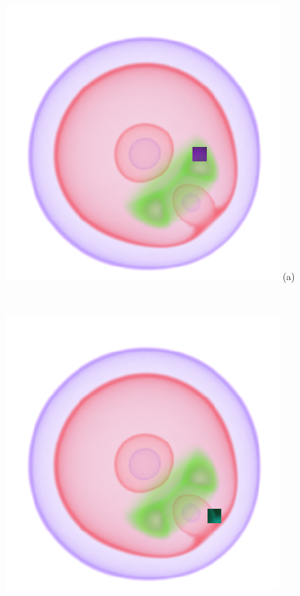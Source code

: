 \documentclass[twoside,twocolumn,10pt]{article}
\begin{document}
\begin{figure}
	\centering
	\begin{minipage}{.2\textwidth}
		\centering
		\includegraphics[width=1\linewidth]{crop/nucleon_selection_green}
(a)
	\end{minipage}~
	\begin{minipage}{.2\textwidth}
		\centering
		\includegraphics[width=1\linewidth]{crop/nucleon_selection_red}

\end{minipage}
\end{figure}
\end{document}
